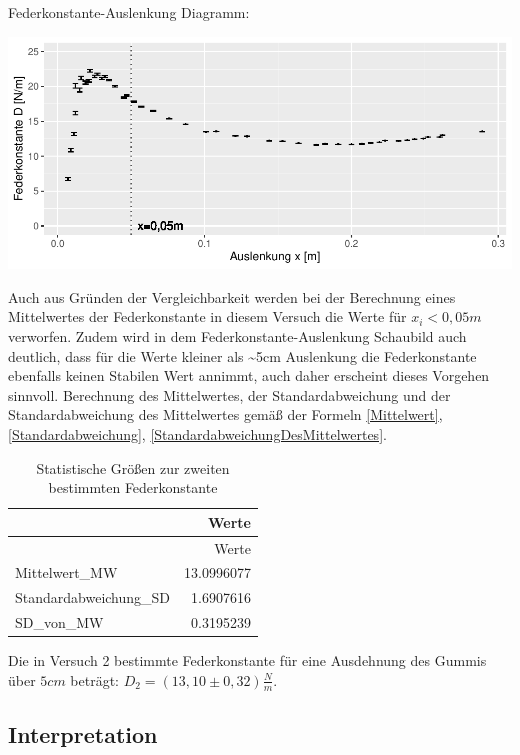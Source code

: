 \documentclass[
  9pt,
]{article}
\begin{document}
Federkonstante-Auslenkung Diagramm:

\begin{center}\includegraphics{DehnbareStoffe_files/figure-latex/unnamed-chunk-15-1} \end{center}

Auch aus Gründen der Vergleichbarkeit werden bei der Berechnung eines
Mittelwertes der Federkonstante in diesem Versuch die Werte für
\(x_i<0,05m\) verworfen. Zudem wird in dem Federkonstante-Auslenkung
Schaubild auch deutlich, dass für die Werte kleiner als
\textasciitilde5cm Auslenkung die Federkonstante ebenfalls keinen
Stabilen Wert annimmt, auch daher erscheint dieses Vorgehen sinnvoll.
Berechnung des Mittelwertes, der Standardabweichung und der
Standardabweichung des Mittelwertes gemäß der Formeln \ref{Mittelwert},
\ref{Standardabweichung}, \ref{StandardabweichungDesMittelwertes}.

\begin{longtable}[]{@{}lr@{}}
\caption{Statistische Größen zur zweiten bestimmten
Federkonstante}\tabularnewline
\toprule()
& Werte \\
\midrule()
\endfirsthead
\toprule()
& Werte \\
\midrule()
\endhead
Mittelwert\_MW & 13.0996077 \\
Standardabweichung\_SD & 1.6907616 \\
SD\_von\_MW & 0.3195239 \\
\bottomrule()
\end{longtable}

Die in Versuch 2 bestimmte Federkonstante für eine Ausdehnung des Gummis
über \(5cm\) beträgt: \(D_2=(13,10 \pm 0,32)\frac{N}{m}\).

\hypertarget{interpretation}{%
\subsection{Interpretation}\label{interpretation}}
\end{document}
